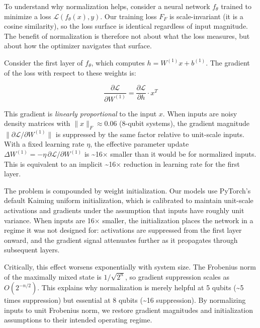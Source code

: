 \documentclass{ieeeqccl}
\begin{document}
To understand why normalization helps, consider a neural network \(f_\theta\) trained to minimize a loss \(\mathcal{L}(f_\theta(x), y)\).  Our training loss \(F_F\) is scale-invariant (it is a cosine similarity), so the loss surface is identical regardless of input magnitude.  The benefit of normalization is therefore not about what the loss measures, but about how the optimizer navigates that surface. 

Consider the first layer of \(f_\theta\), which computes \(h = W^{(1)} x + b^{(1)}\). The gradient of the loss with respect to these weights is:

\begin{equation}
\frac{\partial \mathcal{L}}{\partial W^{(1)}} = \frac{\partial \mathcal{L}}{\partial h} \cdot x^T
\end{equation}

This gradient is \emph{linearly proportional} to the input \(x\).  When inputs are noisy density matrices with \(\|x\|_F \approx 0.06\) (8-qubit systems), the gradient magnitude \(\|\partial \mathcal{L} / \partial W^{(1)}\|\) is suppressed by the same factor relative to unit-scale inputs.  With a fixed learning rate \(\eta\), the effective parameter update \(\Delta W^{(1)} = -\eta \, \partial \mathcal{L} / \partial W^{(1)}\) is \textasciitilde{}16\(\times\) smaller than it would be for normalized inputs.  This is equivalent to an implicit \textasciitilde{}16\(\times\) reduction in learning rate for the first layer.

The problem is compounded by weight initialization.  Our models use PyTorch's default Kaiming uniform initialization, which is calibrated to maintain unit-scale activations and gradients under the assumption that inputs have roughly unit variance.  When inputs are 16\(\times\) smaller, the initialization places the network in a regime it was not designed for: activations are suppressed from the first layer onward, and the gradient signal attenuates further as it propagates through subsequent layers.

Critically, this effect worsens exponentially with system size.  The Frobenius norm of the maximally mixed state is \(1/\sqrt{2^n}\), so gradient suppression scales as \(O(2^{-n/2})\).  This explains why normalization is merely helpful at 5 qubits (\textasciitilde{}5 times suppression) but essential at 8 qubits (\textasciitilde{}16 \texttimes{} suppression).  By normalizing inputs to unit Frobenius norm, we restore gradient magnitudes and initialization assumptions to their intended operating regime.
\end{document}
